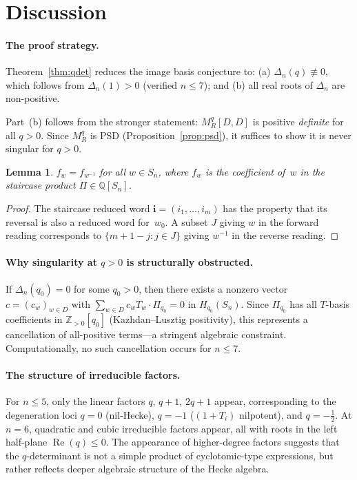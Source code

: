 \documentclass[11pt]{article}
\newtheorem{lemma}[theorem]{Lemma}
\theoremstyle{definition}
\theoremstyle{remark}
\begin{document}
\section{Discussion}

\paragraph{The proof strategy.}
Theorem~\ref{thm:qdet} reduces the image basis conjecture to:
(a) $\Delta_n(q) \not\equiv 0$, which follows from
$\Delta_n(1) > 0$ (verified $n \leq 7$); and
(b) all real roots of $\Delta_n$ are non-positive.

Part~(b) follows from the stronger statement: $M_R^q[D,D]$ is
positive \emph{definite} for all $q > 0$.  Since $M_R^q$ is PSD
(Proposition~\ref{prop:psd}), it suffices to show it is never
singular for $q > 0$.

\begin{lemma}\label{lem:symmetric}
$f_w = f_{w^{-1}}$ for all $w \in S_n$, where $f_w$ is the
coefficient of~$w$ in the staircase product $\Pi \in \mathbb{Q}[S_n]$.
\end{lemma}

\begin{proof}
The staircase reduced word $\mathbf{i} = (i_1, \ldots, i_m)$
has the property that its reversal is also a reduced word for~$w_0$.
A subset $J$ giving $w$ in the forward reading corresponds to
$\{m+1-j : j \in J\}$ giving $w^{-1}$ in the reverse reading.
\end{proof}

\paragraph{Why singularity at $q > 0$ is structurally obstructed.}
If $\Delta_n(q_0) = 0$ for some $q_0 > 0$, then there exists
a nonzero vector $c = (c_w)_{w \in D}$ with $\sum_{w \in D} c_w
T_w \cdot \Pi_{q_0} = 0$ in $H_{q_0}(S_n)$.  Since $\Pi_{q_0}$
has all $T$-basis coefficients in $\mathbb{Z}_{>0}[q_0]$
(Kazhdan--Lusztig positivity), this represents a cancellation
of all-positive terms---a stringent algebraic constraint.
Computationally, no such cancellation occurs for $n \leq 7$.

\paragraph{The structure of irreducible factors.}
For $n \leq 5$, only the linear factors $q$, $q+1$, $2q+1$ appear,
corresponding to the degeneration loci $q = 0$ (nil-Hecke),
$q = -1$ ($(1+T_i)$ nilpotent), and $q = -\frac{1}{2}$.
At $n = 6$, quadratic and cubic irreducible factors appear, all with
roots in the left half-plane $\operatorname{Re}(q) \leq 0$.
The appearance of higher-degree factors suggests that the
$q$-determinant is not a simple product of cyclotomic-type expressions,
but rather reflects deeper algebraic structure of the Hecke algebra.
\end{document}
